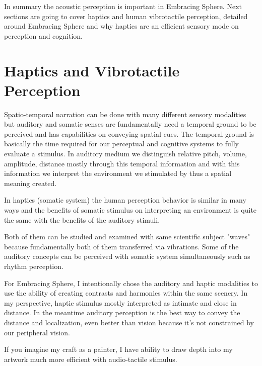                 In summary the acoustic perception is important in Embracing Sphere. Next sections are going to cover haptics and human vibrotactile perception, detailed around Embracing Sphere and why haptics are an efficient sensory mode on perception and cognition.\par
    \section{Haptics and Vibrotactile Perception}
        Spatio-temporal narration can be done with many different sensory modalities but auditory and somatic senses are fundamentally need a temporal ground to be perceived and has capabilities on conveying spatial cues\cite{Haptic_Perception-A_Tutorial}. The temporal ground is basically the time required for our perceptual and cognitive systems to fully evaluate a stimulus\cite{Haptic_Perception-A_Tutorial}. In auditory medium we distinguish relative pitch, volume, amplitude, distance mostly through this temporal information and with this information we interpret the environment we stimulated by thus a spatial meaning created.\cite{Haptic_Rendering}\par

        In haptics (somatic system) the human perception behavior is similar in many ways and the benefits of somatic stimulus on interpreting an environment is quite the same with the benefits of the auditory stimuli\cite{Haptic_Perception-A_Tutorial}.\par

        Both of them can be studied and examined with same scientific subject "waves" because fundamentally both of them transferred via vibrations\cite{Human_Response_to_Vibration}. Some of the auditory concepts can be perceived with somatic system simultaneously such as rhythm perception\cite{Consonance_of_Vibrotactile_Chords}\cite{Composing_Vibrotactile_Music}.\par

        For Embracing Sphere, I intentionally chose the auditory and haptic modalities to use the ability of creating contrasts and harmonies within the same scenery. In my perspective, haptic stimulus mostly interpreted as intimate and close in distance. In the meantime auditory perception is the best way to convey the distance and localization, even better than vision because it's not constrained by our peripheral vision.\par

        If you imagine my craft as a painter, I have ability to draw depth into my artwork much more efficient with audio-tactile stimulus.\par

